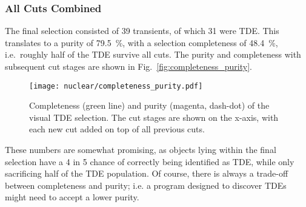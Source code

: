\subsubsection{All Cuts Combined}
The final selection consisted of 39 transients, of which 31 were TDE. This translates to a purity of \SI{79.5}{\percent}, with a selection completeness of \SI{48.4}{\percent}, i.e.~roughly half of the TDE survive all cuts.
The purity and completeness with subsequent cut stages are shown in Fig.~\ref{fig:completeness_purity}.

\begin{figure}[htpb]
  \texttt{[image: nuclear/completeness\_purity.pdf]}
  \caption[Visual TDE selection]{Completeness (green line) and purity (magenta, dash-dot) of the visual TDE selection. The cut stages are shown on the x-axis, with each new cut added on top of all previous cuts.}
\end{figure}

These numbers are somewhat promising, as objects lying within the final selection have a 4 in 5 chance of correctly being identified as TDE, while only sacrificing half of the TDE population. Of course, there is always a trade-off between completeness and purity; i.e. a program designed to discover TDEs might need to accept a lower purity.

